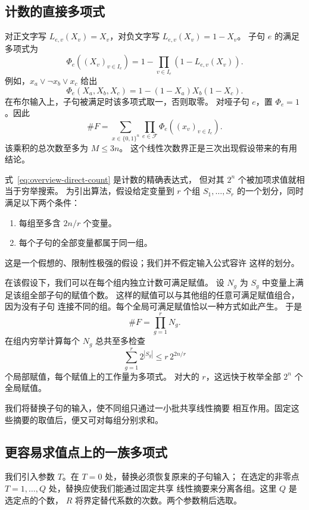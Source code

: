 \documentclass[11pt,reqno]{amsart}
\numberwithin{equation}{section}
\theoremstyle{definition}\newtheorem{definition}[theorem]{定义}
\theoremstyle{remark}\newtheorem{remark}[theorem]{注}
\renewcommand{\le}{\leqslant}
\begin{document}
\subsection{计数的直接多项式}\label{subsec:preview-encoding}
对正文字写 $L_{e,v}(X_v)=X_v$，对负文字写 $L_{e,v}(X_v)=1-X_v$。
子句 $e$ 的满足多项式为
\[
 \Phi_e((X_v)_{v\in I_e})
 =1-\prod_{v\in I_e}(1-L_{e,v}(X_v)).
\]
例如，$x_a\vee\neg x_b\vee x_c$ 给出
\[
 \Phi_e(X_a,X_b,X_c)=1-(1-X_a)X_b(1-X_c).
\]
在布尔输入上，子句被满足时该多项式取一，否则取零。
对哑子句 $e$，置 $\Phi_e=1$。因此
\begin{equation}\label{eq:overview-direct-count}
 \#F=\sum_{x\in\{0,1\}^n}\prod_{e\in\mathcal F}
                   \Phi_e((x_v)_{v\in I_e}).
\end{equation}
该乘积的总次数至多为 $M\le3n$。
这个线性次数界正是三次出现假设带来的有用结论。

式~\eqref{eq:overview-direct-count} 是计数的精确表达式，
但对其 $2^n$ 个被加项求值就相当于穷举搜索。
为引出算法，假设给定变量到 $r$ 个组 $S_1,\ldots,S_r$
的一个划分，同时满足以下两个条件：
\begin{enumerate}
\item 每组至多含 $2n/r$ 个变量。
\item 每个子句的全部变量都属于同一组。
\end{enumerate}
这是一个假想的、限制性极强的假设；我们并不假定输入公式容许
这样的划分。

在该假设下，我们可以在每个组内独立计数可满足赋值。
设 $N_g$ 为 $S_g$ 中变量上满足该组全部子句的赋值个数。
这样的赋值可以与其他组的任意可满足赋值组合，因为没有子句
连接不同的组。每个全局可满足赋值恰以一种方式如此产生。
于是
\[
 \#F=\prod_{g=1}^r N_g.
\]
在组内穷举计算每个 $N_g$ 总共至多检查
\[
 \sum_{g=1}^r 2^{|S_g|}\le r\,2^{2n/r}
\]
个局部赋值，每个赋值上的工作量为多项式。
对大的 $r$，这远快于枚举全部 $2^n$ 个全局赋值。

我们将替换子句的输入，使不同组只通过一小批共享线性摘要
相互作用。固定这些摘要的取值后，便又可对每组分别求和。

\subsection{更容易求值点上的一族多项式}
\label{subsec:preview-deformation}
我们引入参数 $T$。在 $T=0$ 处，替换必须恢复原来的子句输入；
在选定的非零点 $T=1,\ldots,Q$ 处，替换应使我们能通过固定共享
线性摘要来分离各组。这里 $Q$ 是选定点的个数，
$R$ 将界定替代系数的次数。两个参数稍后选取。
\end{document}
